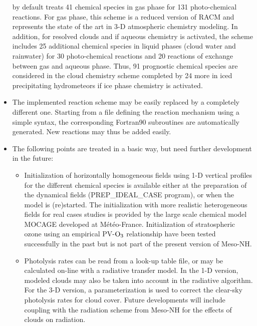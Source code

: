 \begin{itemize}
      by default \citep[ReLACS-AQ,][see Annex~\ref{ReLACSAQ}]{Crassier2000,Leriche2011}
      treats 41 chemical species in gas phase for 131 photo-chemical reactions.
      For gas phase, this scheme is a reduced version of RACM \citep{Stockwell1997}
      and represents the state of the art in 3-D atmospheric chemistry modeling.
      In addition, for resolved clouds and if aqueous chemistry is activated, the scheme
      includes 25 additional chemical species in liquid phases (cloud water and rainwater)
      for 30 photo-chemical reactions and 20 reactions of exchange
      between gas and aqueous phase. 
      Thus, 91 prognostic chemical species are considered in the cloud chemistry scheme
      completed by 24 more in iced precipitating hydrometeors
      if ice phase chemistry is activated.
\item The implemented reaction scheme may be easily replaced by a
      completely different one. Starting from a file defining the reaction mechanism
      using a simple syntax, the corresponding Fortran90 subroutines
      are automatically generated. New reactions may thus be added easily.
\item The following points are treated in a basic way,
      but need further development in the future:
  \begin{itemize}
    \item Initialization of horizontally homogeneous fields using 1-D vertical 
        profiles for the different chemical species is available
        either at the preparation of the dynamical fields
        (PREP\_IDEAL\_CASE program), or when the model is (re)started.
        The initialization with more realistic heterogeneous fields 
        for real cases studies is provided by 
        the large scale chemical model MOCAGE developed at M\'et\'eo-France.
        Initialization of stratospheric ozone using an empirical
        PV-$\rm O_3$ relationship have been tested successfully in
        the past but is not part of the present version of Meso-NH.
    \item Photolysis rates can be read from a look-up table file,
        or may be calculated on-line with a radiative transfer model.
        In the 1-D version, modeled clouds may also be taken into
        account in the radiative algorithm. For the 3-D version, a 
        parameterization is used to correct the clear-sky photolysis rates for
        cloud cover. Future developments will include 
        coupling with the radiation scheme from Meso-NH for the effects of
        clouds on radiation.

\end{itemize}
\end{itemize}
